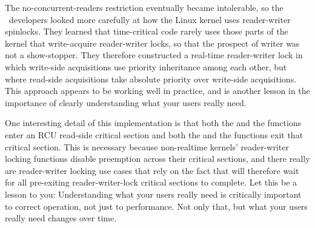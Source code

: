 \QuickQuizEnd

The no-concurrent-readers restriction eventually became intolerable, so
the \rt\ developers looked more carefully at how the Linux kernel uses
reader-writer spinlocks.
They learned that time-critical code rarely uses those parts of the
kernel that write-acquire reader-writer locks, so that the prospect
of writer  was not a show-stopper.
They therefore constructed a real-time reader-writer lock in which
write-side acquisitions use priority inheritance among each other,
but where read-side acquisitions take absolute priority over
write-side acquisitions.
This approach appears to be working well in practice, and is another
lesson in the importance of clearly understanding what your users
really need.

One interesting detail of this implementation is that both the
 and the  functions enter an RCU
read-side critical section and both the  and the
 functions exit that critical section.
This is necessary because non-realtime kernels' reader-writer locking
functions disable preemption across their critical sections, and
there really are reader-writer locking use cases that rely on the fact
that  will therefore wait for all pre-exiting
reader-writer-lock critical sections to complete.
Let this be a lesson to you:
Understanding what your users really need is critically important to
correct operation, not just to performance.
Not only that, but what your users really need changes over time.

